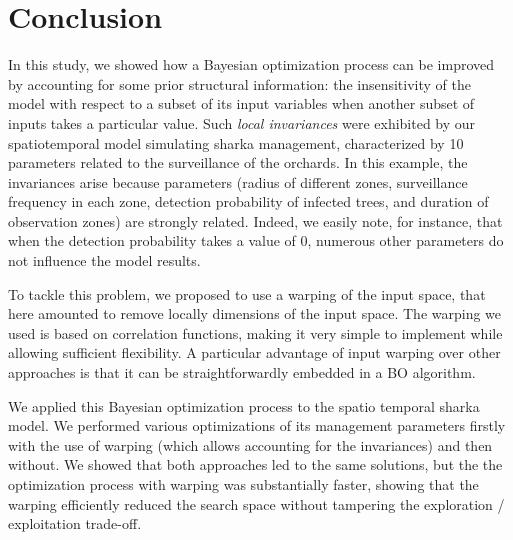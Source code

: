 \section{Conclusion}
In this study, we showed how a Bayesian optimization process can be improved by accounting for some prior structural information: 
the insensitivity of the model with respect to a subset of its input variables when another subset of inputs takes a particular value.
Such \textit{local invariances} were exhibited by our
spatiotemporal model simulating sharka management, characterized by 10 parameters related to the surveillance of the orchards. 
In this example, the invariances arise because parameters (radius of different zones, surveillance frequency in each zone, detection probability of infected trees, 
and duration of observation zones) are strongly related. Indeed, we easily note, for instance, that when the detection probability takes a value of 0, 
numerous other parameters do not influence the model results. 
% 

To tackle this problem, we proposed to use a warping of the input space, that here amounted to remove locally dimensions of the input space.
The warping we used is based on correlation functions, making it very simple to implement while allowing sufficient flexibility.
A particular advantage of input warping over other approaches is that it can be straightforwardly embedded in a BO algorithm.
% 

We applied this Bayesian optimization process to the spatio temporal sharka model. We performed various optimizations of its management parameters 
firstly with the use of warping (which allows accounting for the invariances) and then without. 
We showed that both approaches led to the same solutions, but the the optimization process with warping was substantially faster,
showing that the warping efficiently reduced the search space without tampering the exploration / exploitation trade-off.

